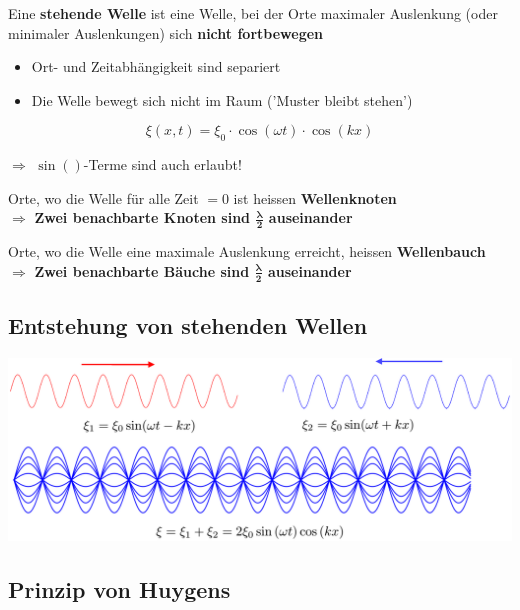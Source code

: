 Eine \textbf{stehende Welle} ist eine Welle, bei der Orte maximaler Auslenkung (oder minimaler Auslenkungen) sich
\textbf{nicht fortbewegen} 


\begin{itemize}
	\item Ort- und Zeitabhängigkeit sind separiert 
	\item Die Welle bewegt sich nicht im Raum ('Muster bleibt stehen') 
\end{itemize}



$$ \boxed{ \xi(x, t) = \xi_0 \cdot \cos(\omega t) \cdot \cos(k x) } $$

$\Rightarrow$ $\sin()$-Terme sind auch erlaubt!\\
\vspace{0.2cm}

Orte, wo die Welle für alle Zeit $= 0$ ist heissen \textbf{Wellenknoten} \\
$\Rightarrow$ \textbf{Zwei benachbarte Knoten sind $\boldsymbol{\frac{\lambda}{2}}$ auseinander}\\
\vspace{0.2cm}

Orte, wo die Welle eine maximale Auslenkung erreicht, heissen \textbf{Wellenbauch} \\
$\Rightarrow$ \textbf{Zwei benachbarte Bäuche sind $\boldsymbol{\frac{\lambda}{2}}$ auseinander}





\subsection{Entstehung von stehenden Wellen}

\includegraphics[width=0.9\linewidth]{Bilder/Wellen-Optik/stehende_wellen}



\subsection{Prinzip von Huygens}

